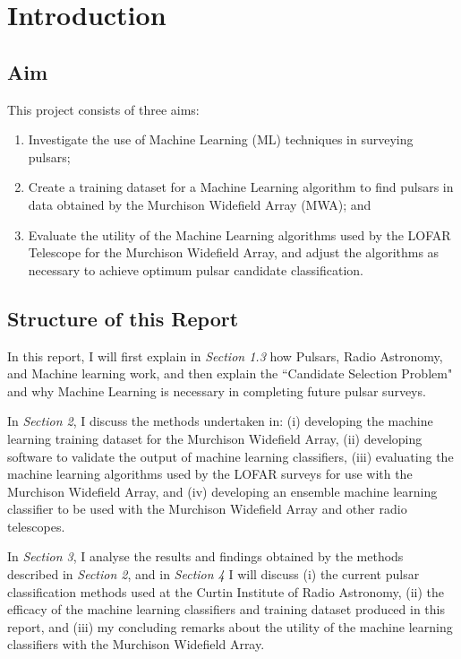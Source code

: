 \documentclass{article}
\begin{document}
\pagebreak

\tableofcontents

\pagebreak


\section{Introduction}

\subsection{Aim}

This project consists of three aims:
\begin{enumerate}[label=\roman*.]
    \item Investigate the use of Machine Learning (ML) techniques in surveying pulsars;
    \item Create a training dataset for a Machine Learning algorithm to find pulsars in data obtained by the Murchison Widefield Array (MWA); and
    \item Evaluate the utility of the Machine Learning algorithms used by the LOFAR Telescope for the Murchison Widefield Array, and adjust the algorithms as necessary to achieve optimum pulsar candidate classification.
\end{enumerate}

\subsection{Structure of this Report}

In this report, I will first explain in \emph{Section 1.3} how Pulsars, Radio Astronomy, and Machine learning work, and then explain the ``Candidate Selection Problem" \autocite{lyon} and why Machine Learning is necessary in completing future pulsar surveys.

In \emph{Section 2}, I discuss the methods undertaken in: (i) developing the machine learning training dataset for the Murchison Widefield Array, (ii) developing software to validate the output of machine learning classifiers, (iii) evaluating the machine learning algorithms used by the LOFAR surveys for use with the Murchison Widefield Array, and (iv) developing an ensemble machine learning classifier to be used with the Murchison Widefield Array and other radio telescopes.

In \emph{Section 3}, I analyse the results and findings obtained by the methods described in \emph{Section 2}, and in \emph{Section 4} I will discuss (i) the current pulsar classification methods used at the Curtin Institute of Radio Astronomy, (ii) the efficacy of the machine learning classifiers and training dataset produced in this report, and (iii) my concluding remarks about the utility of the machine learning classifiers with the Murchison Widefield Array.
\end{document}
